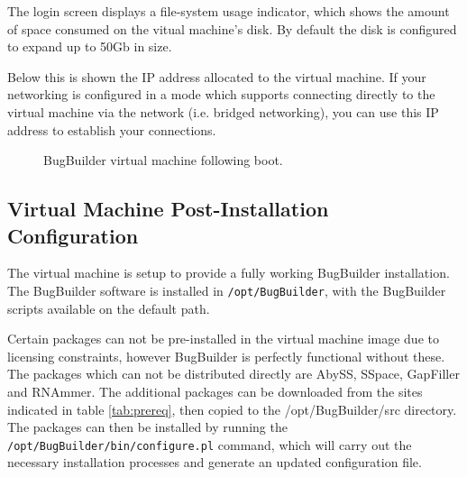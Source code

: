 \documentclass[a4paper,10pt]{article}
\begin{document}
The login screen displays a file-system usage indicator, which shows the amount
of space consumed on the vitual machine's disk. By default the disk is
configured to expand up to 50Gb in size.

Below this is shown the IP address allocated to the virtual machine. If your
networking is configured in a mode which supports connecting directly to the
virtual machine via the network (i.e. bridged networking), you can use this IP
address to establish your connections.

\begin{figure}[H] 
\caption{BugBuilder virtual machine following boot.} \label{fig:vm_running}
\end{figure}

\subsection{Virtual Machine Post-Installation Configuration}

The virtual machine is setup to provide a fully working BugBuilder
installation. The BugBuilder software is installed in {\tt /opt/BugBuilder},
with the BugBuilder scripts available on the default path. 

Certain packages can not be pre-installed in the virtual machine image due to
licensing constraints, however BugBuilder is perfectly functional without
these. The packages which can not be distributed directly are AbySS, SSpace, GapFiller
and RNAmmer. The additional packages can be downloaded from the sites indicated
in table \ref{tab:prereq}, then copied to the /opt/BugBuilder/src directory.
The packages can then be installed by running the
{\tt /opt/BugBuilder/bin/configure.pl} command, which will carry out the
necessary installation processes and generate an updated configuration file.
\end{document}
